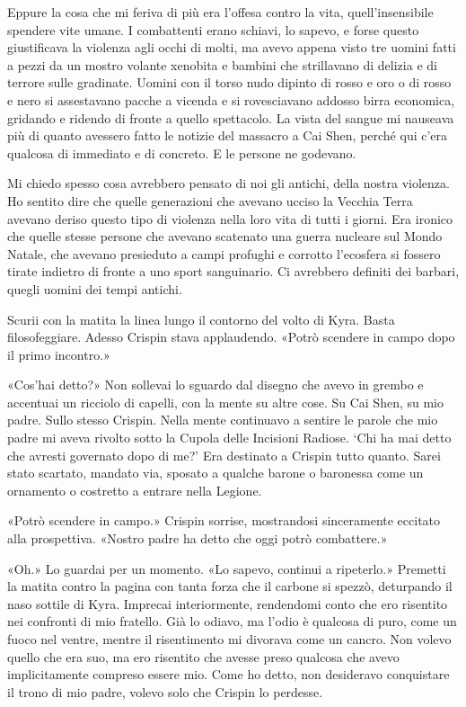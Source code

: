 Eppure la cosa che mi feriva di più era l'offesa contro la vita,
quell'insensibile spendere vite umane. I combattenti erano schiavi, lo
sapevo, e forse questo giustificava la violenza agli occhi di molti, ma
avevo appena visto tre uomini fatti a pezzi da un mostro volante
xenobita e bambini che strillavano di delizia e di terrore sulle
gradinate. Uomini con il torso nudo dipinto di rosso e oro o di rosso e
nero si assestavano pacche a vicenda e si rovesciavano addosso birra
economica, gridando e ridendo di fronte a quello spettacolo. La vista
del sangue mi nauseava più di quanto avessero fatto le notizie del
massacro a Cai Shen, perché qui c'era qualcosa di immediato e di
concreto. E le persone ne godevano.

Mi chiedo spesso cosa avrebbero pensato di noi gli antichi, della nostra
violenza. Ho sentito dire che quelle generazioni che avevano ucciso la
Vecchia Terra avevano deriso questo tipo di violenza nella loro vita di
tutti i giorni. Era ironico che quelle stesse persone che avevano
scatenato una guerra nucleare sul Mondo Natale, che avevano presieduto a
campi profughi e corrotto l'ecosfera si fossero tirate indietro di
fronte a uno sport sanguinario. Ci avrebbero definiti dei barbari,
quegli uomini dei tempi antichi.

Scurii con la matita la linea lungo il contorno del volto di Kyra. Basta
filosofeggiare. Adesso Crispin stava applaudendo. «Potrò scendere in
campo dopo il primo incontro.»

«Cos'hai detto?» Non sollevai lo sguardo dal disegno che avevo in grembo
e accentuai un ricciolo di capelli, con la mente su altre cose. Su Cai
Shen, su mio padre. Sullo stesso Crispin. Nella mente continuavo a
sentire le parole che mio padre mi aveva rivolto sotto la Cupola delle
Incisioni Radiose. `Chi ha mai detto che avresti governato dopo di me?'
Era destinato a Crispin tutto quanto. Sarei stato scartato, mandato via,
sposato a qualche barone o baronessa come un ornamento o costretto a
entrare nella Legione.

«Potrò scendere in campo.» Crispin sorrise, mostrandosi sinceramente
eccitato alla prospettiva. «Nostro padre ha detto che oggi potrò
combattere.»

«Oh.» Lo guardai per un momento. «Lo sapevo, continui a ripeterlo.»
Premetti la matita contro la pagina con tanta forza che il carbone si
spezzò, deturpando il naso sottile di Kyra. Imprecai interiormente,
rendendomi conto che ero risentito nei confronti di mio fratello. Già lo
odiavo, ma l'odio è qualcosa di puro, come un fuoco nel ventre, mentre
il risentimento mi divorava come un cancro. Non volevo quello che era
suo, ma ero risentito che avesse preso qualcosa che avevo implicitamente
compreso essere mio. Come ho detto, non desideravo conquistare il trono
di mio padre, volevo solo che Crispin lo perdesse.

